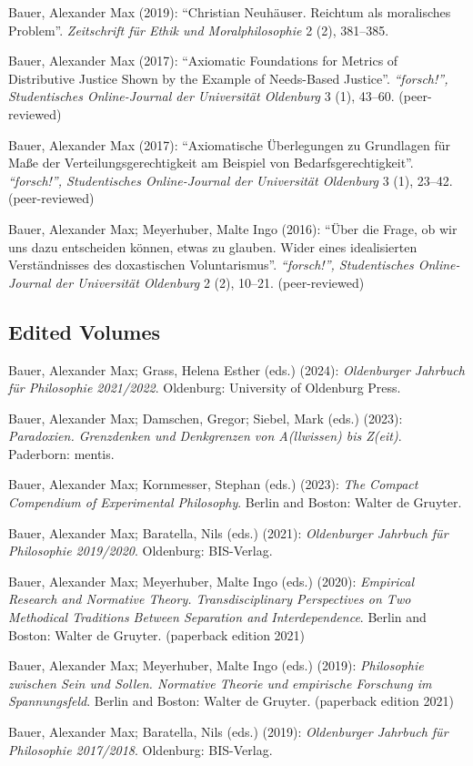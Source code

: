 \documentclass[a4paper,10pt]{article}
\newenvironment{literature}{%
   \parskip6pt\parindent0pt\raggedright
   \def\lititem{\hangindent=1cm\hangafter1}}{%
   \par\ignorespaces}
\begin{document}
\begin{literature}
\lititem Bauer, Alexander Max (2019): \enquote{Christian Neuhäuser. Reichtum als moralisches Problem}. \textit{Zeitschrift für Ethik und Moralphilosophie} 2 (2), 381--385.

\lititem Bauer, Alexander Max (2017): \enquote{Axiomatic Foundations for Metrics of Distributive Justice Shown by the Example of Needs-Based Justice}. \textit{\enquote{forsch!}, Studentisches Online-Journal der Universität Oldenburg} 3 (1), 43--60. (peer-reviewed)

\lititem Bauer, Alexander Max (2017): \enquote{Axiomatische Überlegungen zu Grundlagen für Maße der Verteilungsgerechtigkeit am Beispiel von Bedarfsgerechtigkeit}. \textit{\enquote{forsch!}, Studentisches Online-Journal der Universität Oldenburg} 3 (1), 23--42. (peer-reviewed)

\lititem Bauer, Alexander Max; Meyerhuber, Malte Ingo (2016): \enquote{Über die Frage, ob wir uns dazu entscheiden können, etwas zu glauben. Wider eines idealisierten Verständnisses des doxastischen Voluntarismus}. \textit{\enquote{forsch!}, Studentisches Online-Journal der Universität Oldenburg} 2 (2), 10--21. (peer-reviewed)
\end{literature}

\subsection*{Edited Volumes}
\begin{literature}
\lititem Bauer, Alexander Max; Grass, Helena Esther (eds.) (2024): \textit{Oldenburger Jahrbuch für Philosophie 2021/2022}. Oldenburg: University of Oldenburg Press.

\lititem Bauer, Alexander Max; Damschen, Gregor; Siebel, Mark (eds.) (2023): \textit{Paradoxien. Grenzdenken und Denkgrenzen von A(llwissen) bis Z(eit)}. Paderborn: mentis.

\lititem Bauer, Alexander Max; Kornmesser, Stephan (eds.) (2023): \textit{The Compact Compendium of Experimental Philosophy}. Berlin and Boston: Walter de Gruyter.

\lititem Bauer, Alexander Max; Baratella, Nils (eds.) (2021): \textit{Oldenburger Jahrbuch für Philosophie 2019/2020}. Oldenburg: BIS-Verlag.

\lititem Bauer, Alexander Max; Meyerhuber, Malte Ingo (eds.) (2020): \textit{Empirical Research and Normative Theory. Transdisciplinary Perspectives on Two Methodical Traditions Between Separation and Interdependence}. Berlin and Boston: Walter de Gruyter. (paperback edition 2021)

\lititem Bauer, Alexander Max; Meyerhuber, Malte Ingo (eds.) (2019): \textit{Philosophie zwischen Sein und Sollen. Normative Theorie und empirische Forschung im Spannungsfeld}. Berlin and Boston: Walter de Gruyter. (paperback edition 2021)

\lititem Bauer, Alexander Max; Baratella, Nils (eds.) (2019): \textit{Oldenburger Jahrbuch für Philosophie 2017/2018}. Oldenburg: BIS-Verlag.
\end{literature}
\end{document}
